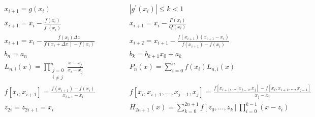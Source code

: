 \documentclass[12pt]{article}
\newcommand{\I}{\ensuremath{\mathbb{I}}}
\newcommand{\diff}[3]{\frac{d^{#3} #1}{d#2^{#3}}}
\newcommand{\pdiff}[3]{\frac{\partial^{#3} #1}{\partial #2^{#3}}}
\newcommand{\abs}[1]{\left| #1 \right|}
\begin{document}
{\large
\[
\begin{array}{cc}
x_{i+1} = g(x_i) \qquad & \qquad |g^\prime(x_i)| \leq k < 1 \\
x_{i+1} = x_i - \frac{f(x_i)}{f^\prime(x_i)} \qquad & \qquad x_{i+1} = x_i - \frac{P(x_i)}{Q(x_i)} \\
x_{i+1} = x_i - \frac{f(x_i) \Delta x}{f(x_i + \Delta x) - f(x_i)} \qquad & \qquad x_{i+2} = x_{i+1} - \frac{f(x_{i+1}) (x_{i+1}-x_i)}{f(x_{i+1}) - f(x_i)} \\ 
b_n = a_n \qquad & \qquad
b_k = b_{k+1}x_0 + a_k \\
L_{n, i}(x) = \prod\limits_{\substack{j=0\\ i \neq j}}^n \frac{x - x_j}{x_i - x_j} \qquad & \qquad
P_n(x) = \sum\limits_{i = 0}^n f(x_i)L_{n,i}(x) \\
f\left[x_i, x_{i+1}\right] = \frac{f(x_{i+1})-f(x_i)}{x_{i+1}-x_i} \qquad & \qquad
f\left[ x_i, x_{i+1}, \ldots, x_{j-1}, x_j\right] = \frac{f\left[x_{i+1}, \ldots, x_{j-1}, x_j\right] - f\left[ x_i, x_{i+1}, \ldots, x_{j-1} \right]}{x_j - x_i} \\
z_{2i} = z_{2i+1} = x_i \qquad & \qquad
H_{2n+1}(x) = \sum\limits_{k=0}^{2n+1} f\left[z_0, \ldots, z_k\right] \prod\limits_{i = 0}^{k-1}(x-z_i) %
\end{array}
\]
}
\end{document}
